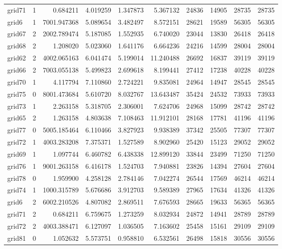 \begin{longtable}{|l|r|r|r|r|r|r|r|r|r|}
grid71 & 1 & 0.684211 & 4.019259 & 1.347873 & 5.367132 & 24836 & 14905 & 28735 & 28735 \\
grid6 & 1 & 7001.947368 & 5.089654 & 3.482497 & 8.572151 & 28621 & 19589 & 56305 & 56305 \\
grid67 & 2 & 2002.789474 & 5.187085 & 1.552935 & 6.740020 & 23044 & 13830 & 26418 & 26418 \\
grid68 & 2 & 1.208020 & 5.023060 & 1.641176 & 6.664236 & 24216 & 14599 & 28004 & 28004 \\
grid62 & 2 & 4002.065163 & 6.041474 & 5.199014 & 11.240488 & 26692 & 16837 & 39119 & 39119 \\
grid66 & 2 & 7003.055138 & 5.499823 & 2.699618 & 8.199441 & 27412 & 17238 & 40228 & 40228 \\
grid70 & 1 & 4.117794 & 7.110860 & 2.724221 & 9.835081 & 24964 & 14947 & 28545 & 28545 \\
grid75 & 0 & 8001.473684 & 5.610720 & 8.032767 & 13.643487 & 35424 & 24532 & 73933 & 73933 \\
grid73 & 1 & 2.263158 & 5.318705 & 2.306001 & 7.624706 & 24968 & 15099 & 28742 & 28742 \\
grid65 & 2 & 1.263158 & 4.803638 & 7.108463 & 11.912101 & 28168 & 17781 & 41196 & 41196 \\
grid77 & 0 & 5005.185464 & 6.110466 & 3.827923 & 9.938389 & 37342 & 25505 & 77307 & 77307 \\
grid72 & 1 & 4003.283208 & 7.375371 & 1.527589 & 8.902960 & 25420 & 15123 & 29052 & 29052 \\
grid69 & 1 & 1.097744 & 6.460782 & 6.438338 & 12.899120 & 33844 & 23499 & 71250 & 71250 \\
grid76 & 1 & 9001.263158 & 6.416178 & 1.524703 & 7.940881 & 23826 & 14394 & 27604 & 27604 \\
grid78 & 0 & 1.959900 & 4.258128 & 2.784146 & 7.042274 & 26544 & 17569 & 46214 & 46214 \\
grid74 & 1 & 1000.315789 & 5.676686 & 3.912703 & 9.589389 & 27965 & 17634 & 41326 & 41326 \\
grid6 & 2 & 6002.210526 & 4.807082 & 2.869511 & 7.676593 & 28665 & 19633 & 56365 & 56365 \\
grid71 & 2 & 0.684211 & 6.759675 & 1.273259 & 8.032934 & 24872 & 14941 & 28789 & 28789 \\
grid72 & 2 & 4003.388471 & 6.127097 & 1.036505 & 7.163602 & 25458 & 15161 & 29109 & 29109 \\
grid81 & 0 & 1.052632 & 5.573751 & 0.958810 & 6.532561 & 26498 & 15818 & 30556 & 30556 \\

\end{longtable}
